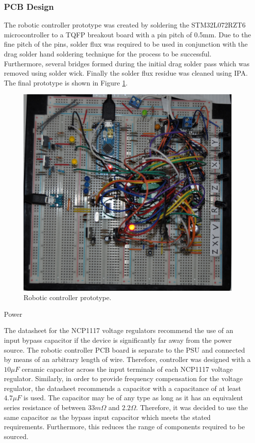 \subsubsection{PCB Design}

The robotic controller prototype was created by soldering the STM32L072RZT6 microcontroller to a TQFP breakout board with a pin pitch of 0.5mm. Due to the fine pitch of the pins, solder flux was required to be used in conjunction with the drag solder hand soldering technique for the process to be successful. Furthermore, several bridges formed during the initial drag solder pass which was removed using solder wick. Finally the solder flux residue was cleaned using IPA. The final prototype is shown in Figure \ref{fig:robotic-controller-prototype}.

\begin{figure}[H]
	\centering
	\includegraphics[width=0.7\linewidth]{figures/robotic-controller-prototype.JPG}
	\caption{Robotic controller prototype.}
	\label{fig:robotic-controller-prototype}
\end{figure}

Power

The datasheet for the NCP1117 voltage regulators recommend the use of an input bypass capacitor if the device is significantly far away from the power source. The robotic controller PCB board is separate to the PSU and connected by means of an arbitrary length of wire. Therefore, controller was designed with a $10\mu F$ ceramic 
capacitor across the input terminals of each NCP1117 voltage regulator. Similarly, in order to provide frequency compensation for the voltage regulator, the datasheet recommends a capacitor with a capacitance of at least $4.7\mu F$ is used. The capacitor may be of any type as long as it has an equivalent series resistance of between $33m\Omega$ and $2.2\Omega$. Therefore, it was decided to use the same capacitor as the bypass input capacitor which meets the stated requirements. Furthermore, this reduces the range of components required to be sourced.

